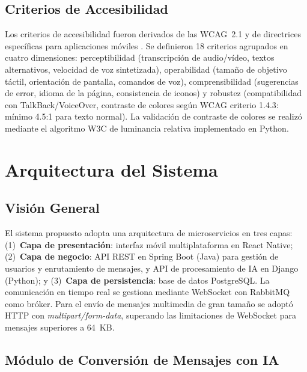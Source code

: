 \documentclass[journal]{IEEEtran}
\begin{document}
\subsection{Criterios de Accesibilidad}

Los criterios de accesibilidad fueron derivados de las WCAG~2.1 \cite{w3c2018} y de directrices espec\'ificas para aplicaciones m\'oviles \cite{ballantyne2018, acosta2020}. Se definieron 18 criterios agrupados en cuatro dimensiones: perceptibilidad (transcripci\'on de audio/v\'ideo, textos alternativos, velocidad de voz sintetizada), operabilidad (tama\~no de objetivo t\'actil, orientaci\'on de pantalla, comandos de voz), comprensibilidad (sugerencias de error, idioma de la p\'agina, consistencia de iconos) y robustez (compatibilidad con TalkBack/VoiceOver, contraste de colores seg\'un WCAG criterio 1.4.3: m\'inimo 4.5:1 para texto normal). La validaci\'on de contraste de colores se realiz\'o mediante el algoritmo W3C de luminancia relativa implementado en Python.

\section{Arquitectura del Sistema}
\label{sec:sistema}

\subsection{Visi\'on General}

El sistema propuesto adopta una arquitectura de microservicios en tres capas: (1)~\textbf{Capa de presentaci\'on}: interfaz m\'ovil multiplataforma en React Native; (2)~\textbf{Capa de negocio}: API REST en Spring Boot (Java) para gesti\'on de usuarios y enrutamiento de mensajes, y API de procesamiento de IA en Django (Python); y (3)~\textbf{Capa de persistencia}: base de datos PostgreSQL. La comunicaci\'on en tiempo real se gestiona mediante WebSocket con RabbitMQ como br\'oker. Para el env\'io de mensajes multimedia de gran tama\~no se adopt\'o HTTP con \textit{multipart/form-data}, superando las limitaciones de WebSocket para mensajes superiores a 64~KB.

\subsection{M\'odulo de Conversi\'on de Mensajes con IA}
\end{document}
